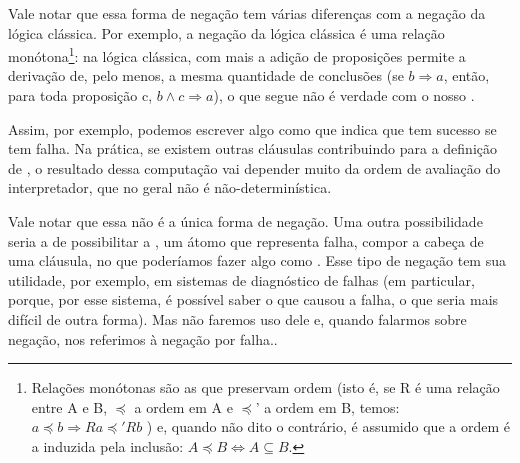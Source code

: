 Vale notar que essa forma de negação tem várias diferenças com a negação da lógica clássica. Por exemplo, a negação da lógica clássica é uma relação monótona\footnote{Relações monótonas são as que preservam ordem (isto é, se R é uma relação entre A e B, $\preceq$ a ordem em A e $\preceq$' a ordem em B, temos: $a \preceq b \Rightarrow Ra \preceq' Rb$ ) e, quando não dito o contrário, é assumido que a ordem é a induzida pela inclusão: $A \preceq B \Leftrightarrow A \subseteq B$.}: na lógica clássica, com mais a adição de proposições permite a derivação de, pelo menos, a mesma quantidade de conclusões (se $b \Rightarrow a$, então, para toda proposição c, $b \wedge c \Rightarrow a$), o que segue não é verdade com o nosso .

Assim, por exemplo, podemos escrever algo como  que indica que  tem sucesso se  tem falha. Na prática, se existem outras cláusulas contribuindo para a definição de , o resultado dessa computação vai depender muito da ordem de avaliação do interpretador, que no geral não é não-determinística.

Vale notar que essa não é a única forma de negação. Uma outra possibilidade seria a de possibilitar
a , um átomo que representa falha, compor a cabeça de uma cláusula, no que poderíamos fazer algo como .
Esse tipo de negação tem sua utilidade, por exemplo, em sistemas de diagnóstico de falhas (em particular, porque, por esse sistema, é possível saber o que causou a falha, o que seria mais difícil de outra forma). Mas não faremos uso dele e, quando
falarmos sobre negação, nos referimos à negação por falha..


